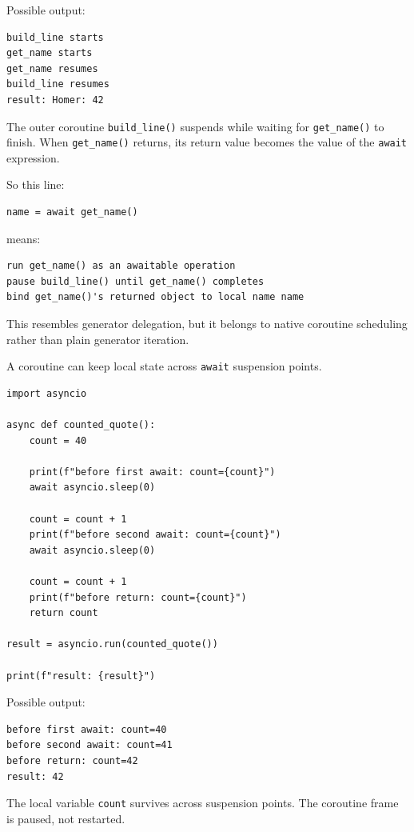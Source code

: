 Possible output:

\begin{verbatim}
build_line starts
get_name starts
get_name resumes
build_line resumes
result: Homer: 42
\end{verbatim}

The outer coroutine \texttt{build\_line()} suspends while waiting for \texttt{get\_name()} to finish. When \texttt{get\_name()} returns, its return value becomes the value of the \texttt{await} expression.

So this line:

\begin{verbatim}
name = await get_name()
\end{verbatim}

means:

\begin{verbatim}
run get_name() as an awaitable operation
pause build_line() until get_name() completes
bind get_name()'s returned object to local name name
\end{verbatim}

This resembles generator delegation, but it belongs to native coroutine scheduling rather than plain generator iteration.

A coroutine can keep local state across \texttt{await} suspension points.

\begin{verbatim}
import asyncio

async def counted_quote():
    count = 40

    print(f"before first await: count={count}")
    await asyncio.sleep(0)

    count = count + 1
    print(f"before second await: count={count}")
    await asyncio.sleep(0)

    count = count + 1
    print(f"before return: count={count}")
    return count

result = asyncio.run(counted_quote())

print(f"result: {result}")
\end{verbatim}

Possible output:

\begin{verbatim}
before first await: count=40
before second await: count=41
before return: count=42
result: 42
\end{verbatim}

The local variable \texttt{count} survives across suspension points. The coroutine frame is paused, not restarted.

